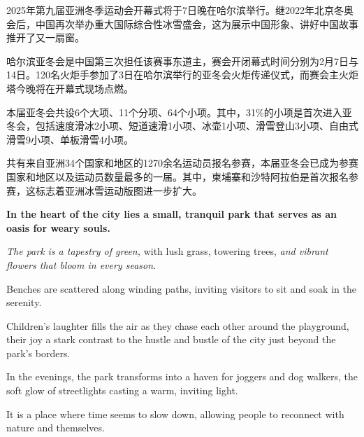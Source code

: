 \documentclass[10pt]{article}
\begin{document}
\begin{Huge}
2025年第九届亚洲冬季运动会开幕式将于7日晚在哈尔滨举行。继2022年北京冬奥会后，中国再次举办重大国际综合性冰雪盛会，这为展示中国形象、讲好中国故事推开了又一扇窗。
\end{Huge}

{\fontsize{16pt}{16pt}\selectfont
哈尔滨亚冬会是中国第三次担任该赛事东道主，赛会开闭幕式时间分别为2月7日与14日。120名火炬手参加了3日在哈尔滨举行的亚冬会火炬传递仪式，而赛会主火炬塔今晚将在开幕式现场点燃。}

{
本届亚冬会共设6个大项、11个分项、64个小项。其中，31\%的小项是首次进入亚冬会，包括速度滑冰2小项、短道速滑1小项、冰壶1小项、滑雪登山3小项、自由式滑雪9小项、单板滑雪4小项。}

{\heiti
共有来自亚洲34个国家和地区的1270余名运动员报名参赛，本届亚冬会已成为参赛国家和地区以及运动员数量最多的一届。其中，柬埔寨和沙特阿拉伯是首次报名参赛，这标志着亚洲冰雪运动版图进一步扩大。}

\vspace{2em}
{\bfseries
In the heart of the city lies a small, tranquil park that serves as an oasis for weary souls. 
}

{\itshape
The park is a tapestry of green,} with lush grass, towering trees, \textit{and vibrant flowers that bloom in every season.}

 Benches are scattered along winding paths, inviting visitors to sit and soak in the serenity. 

 Children's laughter fills the air as they chase each other around the playground, their joy a stark contrast to the hustle and bustle of the city just beyond the park's borders.

  In the evenings, the park transforms into a haven for joggers and dog walkers, the soft glow of streetlights casting a warm, inviting light. 

  It is a place where time seems to slow down, allowing people to reconnect with nature and themselves.
\end{document}
